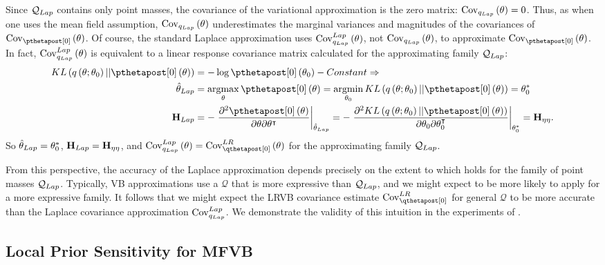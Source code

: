 \documentclass{article}\usepackage[]{graphicx}\usepackage[]{color}
\theoremstyle{definition}
\theoremstyle{plain}
\theoremstyle{plain}
\theoremstyle{plain}
\theoremstyle{definition}
\theoremstyle{plain}
\theoremstyle{plain}
\begin{document}
Since $\mathcal{Q}_{Lap}$ contains only point masses, the covariance of the variational
approximation is the zero matrix: $\mathrm{Cov}_{q_{Lap}}\left(\theta\right)=0$.
Thus, as when one uses the mean field assumption, $\mathrm{Cov}_{q_{Lap}}\left(\theta\right)$
underestimates the marginal variances and magnitudes of the covariances
of $\pcov\left(\theta\right)$. Of course, the standard Laplace approximation
uses $\mathrm{Cov}_{q_{Lap}}^{Lap}\left(\theta\right)$, not $\mathrm{Cov}_{q_{Lap}}\left(\theta\right)$,
to approximate $\pcov\left(\theta\right)$. In fact,
$\mathrm{Cov}_{q_{Lap}}^{Lap}\left(\theta\right)$
is equivalent to a linear response covariance matrix calculated for
the approximating family $\mathcal{Q}_{Lap}$:
\begin{align*}
KL\left(q\left(\theta;\theta_{0}\right)||\pzeropost\left(\theta\right)\right) &
    =-\log\pzeropost\left(\theta_{0}\right)-\constant\Rightarrow\\
\laptheta & =\argmax_{\theta}\pzeropost\left(\theta\right) =
    \argmin_{\theta_{0}}KL\left(q\left(\theta;\theta_{0}\right)||\pzeropost
    \left(\theta\right)\right)=\theta_{0}^{*}\\
\laphess & =-\left.\frac{\partial^{2}\pzeropost\left(\theta\right)}
    {\partial\theta\partial\theta^{\trans}}\right|_{\laptheta} =
    -\left.\frac{\partial^{2}
        KL\left(q\left(\theta;\theta_{0}\right)||
            \pzeropost\left(\theta\right)\right)}{\partial\theta_{0}
            \partial\theta_{0}^{\trans}}\right|_{\theta_{0}^{*}}=\klhess.
\end{align*}
So $\hat{\theta}_{Lap}=\theta_{0}^{*}$, $\mathbf{H}_{Lap}=\mathbf{H}_{\eta\eta}$,
and $\covlap\left(\theta\right)=\lrvbcov\left(\theta\right)$
for the approximating family $\mathcal{Q}_{Lap}$.

From this perspective, the accuracy of the Laplace approximation depends
precisely on the extent to which  holds
for the family of point masses $\mathcal{Q}_{Lap}$. Typically, VB approximations
use a $\mathcal{Q}$ that is more expressive than $\mathcal{Q}_{Lap}$,
and we might expect  to be more likely
to apply for a more expressive family. It follows that we might expect
the LRVB covariance estimate $\lrvbcov$ for general $\mathcal{Q}$
to be more accurate than the Laplace covariance approximation $\mathrm{Cov}_{q_{Lap}}^{Lap}$.
We demonstrate the validity of this intuition in the experiments of
.

\subsection{Local Prior Sensitivity for MFVB \label{subsec:lrvb_robustness} }
\end{document}
